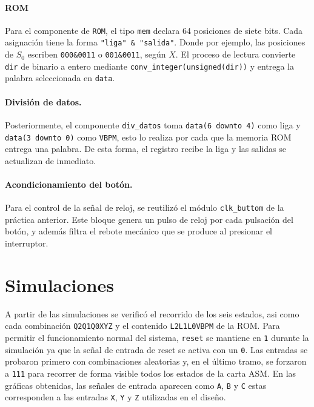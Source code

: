 \documentclass[letterpaper,12pt]{article}
\begin{document}


\paragraph{ROM} Para el componente de \texttt{ROM}, el tipo \texttt{mem} declara 64 posiciones de siete bits. Cada asignación tiene la forma \texttt{"liga" \& "salida"}. Donde por ejemplo, las posiciones de $S_0$ escriben \texttt{000\&0011} o \texttt{001\&0011}, según $X$. El proceso de lectura convierte \texttt{dir} de binario a entero mediante \texttt{conv\_integer(unsigned(dir))} y entrega la palabra seleccionada en \texttt{data}.



\paragraph{División de datos.} Posteriormente, el componente \texttt{div\_datos} toma \texttt{data(6 downto 4)} como liga y \texttt{data(3 downto 0)} como \texttt{VBPM}, esto lo realiza por cada que la memoria ROM entrega una palabra. De esta forma, el registro recibe la liga y las salidas se actualizan de inmediato.



\paragraph{Acondicionamiento del botón.}  Para el control de la señal de reloj, se reutilizó el módulo \texttt{clk\_buttom} de la práctica anterior. Este bloque genera un pulso de reloj por cada pulsación del botón, y además filtra el rebote mecánico que se produce al presionar el interruptor.

\section{Simulaciones}
A partir de las simulaciones se verificó el recorrido de los seis estados, asi como cada combinación \texttt{Q2Q1Q0XYZ} y el contenido \texttt{L2L1L0VBPM} de la ROM. Para permitir el funcionamiento normal del sistema, \texttt{reset} se mantiene en \texttt{1} durante la simulación ya que la señal de entrada de reset se activa con un \texttt{0}. Las entradas se probaron primero con combinaciones aleatorias y, en el último tramo, se forzaron a \texttt{111} para recorrer de forma visible todos los estados de la carta ASM. En las gráficas obtenidas, las señales de entrada aparecen como \texttt{A}, \texttt{B} y \texttt{C} estas corresponden a las entradas \texttt{X}, \texttt{Y} y \texttt{Z} utilizadas en el diseño.
\end{document}
